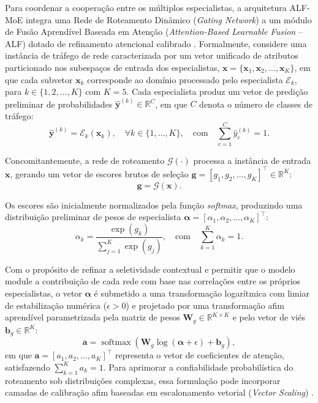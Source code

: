 Para coordenar a cooperação entre os múltiplos especialistas, a arquitetura ALF-MoE integra uma Rede de Roteamento Dinâmico (\emph{Gating Network}) a um módulo de Fusão Aprendível Baseada em Atenção (\emph{Attention-Based Learnable Fusion} -- ALF) dotado de refinamento atencional calibrado \cite{alfmoe2026}. Formalmente, considere uma instância de tráfego de rede caracterizada por um vetor unificado de atributos particionado nos subespaços de entrada dos especialistas, $\mathbf{x} = \{\mathbf{x}_1, \mathbf{x}_2, \dots, \mathbf{x}_K\}$, em que cada subvetor $\mathbf{x}_k$ corresponde ao domínio processado pelo especialista $\mathcal{E}_k$, para $k \in \{1, 2, \dots, K\}$ com $K = 5$. Cada especialista produz um vetor de predição preliminar de probabilidades $\hat{\mathbf{y}}^{(k)} \in \mathbb{R}^C$, em que $C$ denota o número de classes de tráfego:
\begin{equation}
\label{eq:expert_prediction}
\hat{\mathbf{y}}^{(k)} = \mathcal{E}_k(\mathbf{x}_k), \quad \forall k \in \{1, \dots, K\}, \quad \text{com} \quad \sum_{c=1}^C \hat{y}_c^{(k)} = 1.
\end{equation}

Concomitantemente, a rede de roteamento $\mathcal{G}(\cdot)$ processa a instância de entrada $\mathbf{x}$, gerando um vetor de escores brutos de seleção $\mathbf{g} = [g_1, g_2, \dots, g_K]^\top \in \mathbb{R}^K$:
\begin{equation}
\label{eq:gating_scores}
\mathbf{g} = \mathcal{G}(\mathbf{x}).
\end{equation}

Os escores são inicialmente normalizados pela função \emph{softmax}, produzindo uma distribuição preliminar de pesos de especialista $\boldsymbol{\alpha} = [\alpha_1, \alpha_2, \dots, \alpha_K]^\top$:
\begin{equation}
\label{eq:intro_gating_softmax}
\alpha_k = \frac{\exp(g_k)}{\sum_{j=1}^K \exp(g_j)}, \quad \text{com} \quad \sum_{k=1}^K \alpha_k = 1.
\end{equation}

Com o propósito de refinar a seletividade contextual e permitir que o modelo module a contribuição de cada rede com base nas correlações entre os próprios especialistas, o vetor $\boldsymbol{\alpha}$ é submetido a uma transformação logarítmica com limiar de estabilização numérica ($\epsilon > 0$) e projetado por uma transformação afim aprendível parametrizada pela matriz de pesos $\mathbf{W}_g \in \mathbb{R}^{K \times K}$ e pelo vetor de viés $\mathbf{b}_g \in \mathbb{R}^K$:
\begin{equation}
\label{eq:attention_weights}
\mathbf{a} = \operatorname{softmax}\left(\mathbf{W}_g \log(\boldsymbol{\alpha} + \epsilon) + \mathbf{b}_g\right),
\end{equation}
em que $\mathbf{a} = [a_1, a_2, \dots, a_K]^\top$ representa o vetor de coeficientes de atenção, satisfazendo $\sum_{k=1}^K a_k = 1$. Para aprimorar a confiabilidade probabilística do roteamento sob distribuições complexas, essa formulação pode incorporar camadas de calibração afim baseadas em escalonamento vetorial (\emph{Vector Scaling}) \cite{guo2017calibration}.

